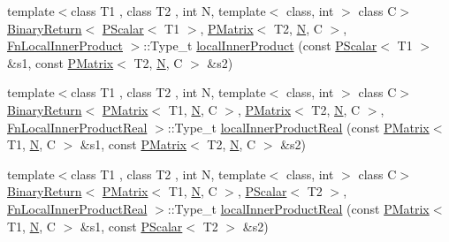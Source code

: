 \begin{DoxyCompactItemize}
\item 
{\footnotesize template$<$class T1 , class T2 , int N, template$<$ class, int $>$ class C$>$ }\\\mbox{\hyperlink{structENSEM_1_1BinaryReturn}{Binary\+Return}}$<$ \mbox{\hyperlink{classENSEM_1_1PScalar}{P\+Scalar}}$<$ T1 $>$, \mbox{\hyperlink{classENSEM_1_1PMatrix}{P\+Matrix}}$<$ T2, \mbox{\hyperlink{operator__name__util_8cc_a7722c8ecbb62d99aee7ce68b1752f337}{N}}, C $>$, \mbox{\hyperlink{structENSEM_1_1FnLocalInnerProduct}{Fn\+Local\+Inner\+Product}} $>$\+::Type\+\_\+t \mbox{\hyperlink{group__primmatrix_gaaa8729c59af4a03489be7e620e3dd187}{local\+Inner\+Product}} (const \mbox{\hyperlink{classENSEM_1_1PScalar}{P\+Scalar}}$<$ T1 $>$ \&s1, const \mbox{\hyperlink{classENSEM_1_1PMatrix}{P\+Matrix}}$<$ T2, \mbox{\hyperlink{operator__name__util_8cc_a7722c8ecbb62d99aee7ce68b1752f337}{N}}, C $>$ \&s2)
\item 
{\footnotesize template$<$class T1 , class T2 , int N, template$<$ class, int $>$ class C$>$ }\\\mbox{\hyperlink{structENSEM_1_1BinaryReturn}{Binary\+Return}}$<$ \mbox{\hyperlink{classENSEM_1_1PMatrix}{P\+Matrix}}$<$ T1, \mbox{\hyperlink{operator__name__util_8cc_a7722c8ecbb62d99aee7ce68b1752f337}{N}}, C $>$, \mbox{\hyperlink{classENSEM_1_1PMatrix}{P\+Matrix}}$<$ T2, \mbox{\hyperlink{operator__name__util_8cc_a7722c8ecbb62d99aee7ce68b1752f337}{N}}, C $>$, \mbox{\hyperlink{structENSEM_1_1FnLocalInnerProductReal}{Fn\+Local\+Inner\+Product\+Real}} $>$\+::Type\+\_\+t \mbox{\hyperlink{group__primmatrix_ga512767c96aa10eafdf3b60be8dd2e9bb}{local\+Inner\+Product\+Real}} (const \mbox{\hyperlink{classENSEM_1_1PMatrix}{P\+Matrix}}$<$ T1, \mbox{\hyperlink{operator__name__util_8cc_a7722c8ecbb62d99aee7ce68b1752f337}{N}}, C $>$ \&s1, const \mbox{\hyperlink{classENSEM_1_1PMatrix}{P\+Matrix}}$<$ T2, \mbox{\hyperlink{operator__name__util_8cc_a7722c8ecbb62d99aee7ce68b1752f337}{N}}, C $>$ \&s2)
\item 
{\footnotesize template$<$class T1 , class T2 , int N, template$<$ class, int $>$ class C$>$ }\\\mbox{\hyperlink{structENSEM_1_1BinaryReturn}{Binary\+Return}}$<$ \mbox{\hyperlink{classENSEM_1_1PMatrix}{P\+Matrix}}$<$ T1, \mbox{\hyperlink{operator__name__util_8cc_a7722c8ecbb62d99aee7ce68b1752f337}{N}}, C $>$, \mbox{\hyperlink{classENSEM_1_1PScalar}{P\+Scalar}}$<$ T2 $>$, \mbox{\hyperlink{structENSEM_1_1FnLocalInnerProductReal}{Fn\+Local\+Inner\+Product\+Real}} $>$\+::Type\+\_\+t \mbox{\hyperlink{group__primmatrix_ga9db3f5557c105ded2a1e426229646f23}{local\+Inner\+Product\+Real}} (const \mbox{\hyperlink{classENSEM_1_1PMatrix}{P\+Matrix}}$<$ T1, \mbox{\hyperlink{operator__name__util_8cc_a7722c8ecbb62d99aee7ce68b1752f337}{N}}, C $>$ \&s1, const \mbox{\hyperlink{classENSEM_1_1PScalar}{P\+Scalar}}$<$ T2 $>$ \&s2)

\end{DoxyCompactItemize}
